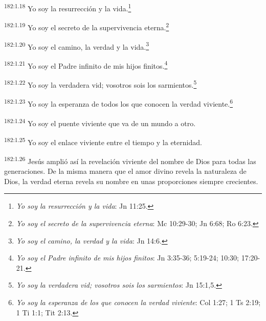 \par
\textsuperscript{182:1.18} Yo soy la resurrección y la vida.\footnote{\textit{Yo soy la resurrección y la vida}: Jn 11:25.}

\par
\textsuperscript{182:1.19} Yo soy el secreto de la supervivencia eterna.\footnote{\textit{Yo soy el secreto de la supervivencia eterna}: Mc 10:29-30; Jn 6:68; Ro 6:23.}

\par
\textsuperscript{182:1.20} Yo soy el camino, la verdad y la vida.\footnote{\textit{Yo soy el camino, la verdad y la vida}: Jn 14:6.}

\par
\textsuperscript{182:1.21} Yo soy el Padre infinito de mis hijos finitos.\footnote{\textit{Yo soy el Padre infinito de mis hijos finitos}: Jn 3:35-36; 5:19-24; 10:30; 17:20-21.}

\par
\textsuperscript{182:1.22} Yo soy la verdadera vid; vosotros sois los sarmientos.\footnote{\textit{Yo soy la verdadera vid; vosotros sois los sarmientos}: Jn 15:1,5.}

\par
\textsuperscript{182:1.23} Yo soy la esperanza de todos los que conocen la verdad viviente.\footnote{\textit{Yo soy la esperanza de los que conocen la verdad viviente}: Col 1:27; 1 Ts 2:19; 1 Ti 1:1; Tit 2:13.}

\par
\textsuperscript{182:1.24} Yo soy el puente viviente que va de un mundo a otro.

\par
\textsuperscript{182:1.25} Yo soy el enlace viviente entre el tiempo y la eternidad.

\par
\textsuperscript{182:1.26} Jesús amplió así la revelación viviente del nombre de Dios para todas las generaciones. De la misma manera que el amor divino revela la naturaleza de Dios, la verdad eterna revela su nombre en unas proporciones siempre crecientes.

